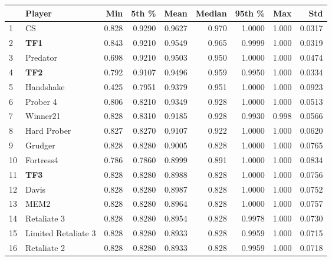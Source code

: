 \begin{tabular}{llrrrrrrr}
\toprule
{} &               Player &    Min &   5th \% &    Mean &  Median &  95th \% &    Max &     Std \\
\midrule
1  &                   CS &  0.828 &  0.9290 &  0.9627 &   0.970 &  1.0000 &  1.000 &  0.0317 \\
2  &                  \textbf{TF1} &  0.843 &  0.9210 &  0.9549 &   0.965 &  0.9999 &  1.000 &  0.0319 \\
3  &             Predator &  0.698 &  0.9210 &  0.9503 &   0.950 &  1.0000 &  1.000 &  0.0474 \\
4  &                  \textbf{TF2} &  0.792 &  0.9107 &  0.9496 &   0.959 &  0.9950 &  1.000 &  0.0334 \\
5  &            Handshake &  0.425 &  0.7951 &  0.9379 &   0.951 &  1.0000 &  1.000 &  0.0923 \\
6  &             Prober 4 &  0.806 &  0.8210 &  0.9349 &   0.928 &  1.0000 &  1.000 &  0.0513 \\
7  &             Winner21 &  0.828 &  0.8310 &  0.9185 &   0.928 &  0.9930 &  0.998 &  0.0566 \\
8  &          Hard Prober &  0.827 &  0.8270 &  0.9107 &   0.922 &  1.0000 &  1.000 &  0.0620 \\
9  &              Grudger &  0.828 &  0.8280 &  0.9005 &   0.828 &  1.0000 &  1.000 &  0.0765 \\
10 &            Fortress4 &  0.786 &  0.7860 &  0.8999 &   0.891 &  1.0000 &  1.000 &  0.0834 \\
11 &                  \textbf{TF3} &  0.828 &  0.8280 &  0.8988 &   0.828 &  1.0000 &  1.000 &  0.0756 \\
12 &                Davis &  0.828 &  0.8280 &  0.8987 &   0.828 &  1.0000 &  1.000 &  0.0752 \\
13 &                 MEM2 &  0.828 &  0.8280 &  0.8964 &   0.828 &  1.0000 &  1.000 &  0.0757 \\
14 &          Retaliate 3 &  0.828 &  0.8280 &  0.8954 &   0.828 &  0.9978 &  1.000 &  0.0730 \\
15 &  Limited Retaliate 3 &  0.828 &  0.8280 &  0.8933 &   0.828 &  0.9959 &  1.000 &  0.0715 \\
16 &          Retaliate 2 &  0.828 &  0.8280 &  0.8933 &   0.828 &  0.9959 &  1.000 &  0.0718 \\
\bottomrule
\end{tabular}
